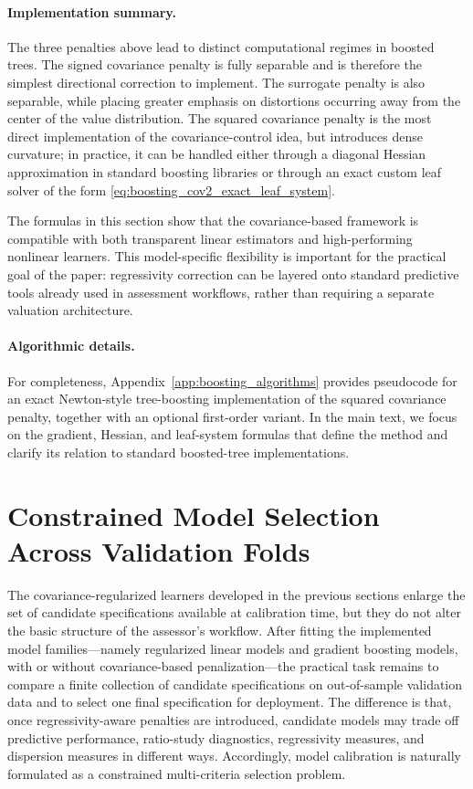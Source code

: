 \documentclass[12pt, draft]{article}
\theoremstyle{plain}
\theoremstyle{definition}
\newcommand{\1}{\mathbf{1}}
\begin{document}
\paragraph{Implementation summary.}
The three penalties above lead to distinct computational regimes in boosted trees. The signed covariance penalty is fully separable and is therefore the simplest directional correction to implement. The surrogate penalty is also separable, while placing greater emphasis on distortions occurring away from the center of the value distribution. The squared covariance penalty is the most direct implementation of the covariance-control idea, but introduces dense curvature; in practice, it can be handled either through a diagonal Hessian approximation in standard boosting libraries or through an exact custom leaf solver of the form \eqref{eq:boosting_cov2_exact_leaf_system}.

The formulas in this section show that the covariance-based framework is compatible with both transparent linear estimators and high-performing nonlinear learners. This model-specific flexibility is important for the practical goal of the paper: regressivity correction can be layered onto standard predictive tools already used in assessment workflows, rather than requiring a separate valuation architecture.

\paragraph{Algorithmic details.}
For completeness, Appendix~\ref{app:boosting_algorithms} provides pseudocode for an exact Newton-style tree-boosting implementation of the squared covariance penalty, together with an optional first-order variant. In the main text, we focus on the gradient, Hessian, and leaf-system formulas that define the method and clarify its relation to standard boosted-tree implementations.

\section{Constrained Model Selection Across Validation Folds}
\label{subsec:model_selection}



The covariance-regularized learners developed in the previous sections enlarge the set of candidate specifications available at calibration time, but they do not alter the basic structure of the assessor's workflow. After fitting the implemented model families---namely regularized linear models and gradient boosting models, with or without covariance-based penalization---the practical task remains to compare a finite collection of candidate specifications on out-of-sample validation data and to select one final specification for deployment. The difference is that, once regressivity-aware penalties are introduced, candidate models may trade off predictive performance, ratio-study diagnostics, regressivity measures, and dispersion measures in different ways. Accordingly, model calibration is naturally formulated as a constrained multi-criteria selection problem.
\end{document}
